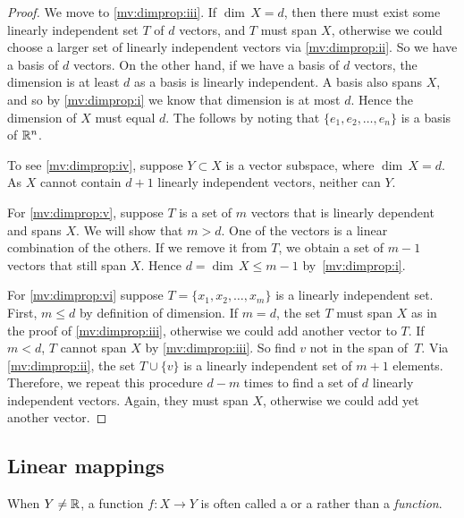 \begin{proof}
We move to \ref{mv:dimprop:iii}.
If $\dim \, X = d$,
then there must exist some linearly independent set $T$ of $d$ vectors,
and $T$ must span $X$, otherwise we could choose a larger set of linearly
independent vectors via \ref{mv:dimprop:ii}.
So we have a basis of $d$ vectors.
On the other hand, if we have a basis of $d$ vectors,
the dimension is at least $d$ as a basis is linearly independent.
A basis also spans $X$, and so
by \ref{mv:dimprop:i} we know that dimension is at most $d$.
Hence the dimension of $X$ must equal $d$.
The  follows by noting that
$\{ e_1, e_2, \ldots, e_n \}$ is a basis of ${\mathbb{R}}^n$.

To see \ref{mv:dimprop:iv},
suppose $Y \subset X$ is a vector subspace,
where $\dim \, X = d$.  As $X$ cannot contain $d+1$ linearly independent
vectors, neither can $Y$.

For \ref{mv:dimprop:v}, suppose $T$ is a set of $m$ vectors
that is linearly dependent
and spans $X$.
We will show that $m > d$.
One of the
vectors is a linear combination of the others.  If we remove it
from $T$, we obtain a set of $m-1$ vectors that still span $X$.
Hence
$d = \dim \, X \leq m-1$ by~\ref{mv:dimprop:i}.

For \ref{mv:dimprop:vi} suppose $T = \{ x_1, x_2, \ldots, x_m \}$ is
a linearly independent set.  First, $m \leq d$ by definition of dimension.
If $m=d$, the set $T$ must span $X$ as in the proof of \ref{mv:dimprop:iii},
otherwise we could add another vector to $T$.
If $m < d$,  $T$ cannot span $X$ by \ref{mv:dimprop:iii}.
So find $v$ not in the span of~$T$.
Via \ref{mv:dimprop:ii}, the set $T \cup \{ v \}$ is
a linearly independent set of $m+1$ elements.
Therefore, we repeat this procedure $d-m$ times to
find a set of $d$ linearly independent vectors.
Again, they must span $X$, otherwise we could add yet another vector.
\end{proof}

\subsection{Linear mappings}

When $Y \neq {\mathbb{R}}$,
a function $f \colon X \to Y$ is often called a
\emph{} or a \emph{}
rather than a \emph{function}.

